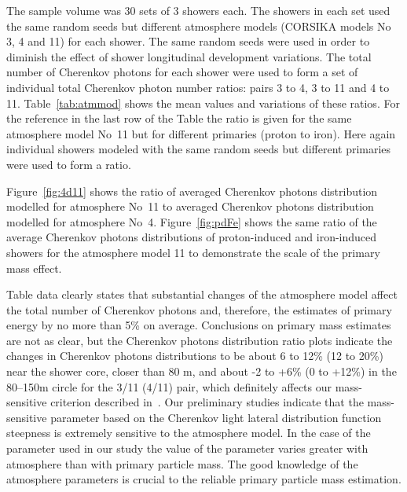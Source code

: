 \documentclass[universe,article,submit,moreauthors,pdftex]{Definitions/mdpi}
\begin{document}
The sample volume was 30 sets of 3 showers each. The showers in each set used the same random seeds but different atmosphere models (CORSIKA models No 3, 4 and 11) for each shower. The same random seeds were used in order to diminish the effect of shower longitudinal development variations. The total number of Cherenkov photons for each shower were used to form a set of individual total Cherenkov photon number ratios: pairs 3 to 4, 3 to 11 and 4 to 11. Table~\ref{tab:atmmod} shows the mean values and variations of these ratios. For the reference in the last row of the Table the ratio is given for the same atmosphere model No~11 but for different primaries (proton to iron). Here again individual showers modeled with the same random seeds but different primaries were used to form a ratio. 

Figure~\ref{fig:4d11} shows the ratio of averaged Cherenkov photons distribution modelled for atmosphere No~11 to averaged Cherenkov photons distribution modelled for atmosphere No~4. Figure~\ref{fig:pdFe} shows the same ratio of the average Cherenkov photons distributions of proton-induced and iron-induced showers for the atmosphere model 11 to demonstrate the scale of the primary mass effect.


Table data clearly states that substantial changes of the atmosphere model affect the total number of Cherenkov photons and, therefore, the estimates of primary energy by no more than 5\% on average. Conclusions on primary mass estimates are not as clear, but the Cherenkov photons distribution ratio plots indicate the changes in Cherenkov photons distributions to be about 6 to 12\% (12 to 20\%) near the shower core, closer than 80 m, and about -2 to +6\% (0 to +12\%) in the 80--150m circle for the 3/11 (4/11) pair, which definitely affects our mass-sensitive criterion described in~\cite{Ant15c}. Our preliminary studies indicate that the mass-sensitive parameter based on the Cherenkov light lateral distribution function steepness is extremely sensitive to the atmosphere model. In the case of the parameter used in our study the value of the parameter varies greater with atmosphere than with primary particle mass. The good knowledge of the atmosphere parameters is crucial to the reliable primary particle mass estimation.
\end{document}

